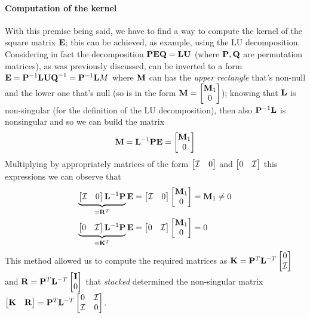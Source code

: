 	\paragraph{Computation of the kernel} With this premise being said, we have to find a way to compute the kernel of the square matrix $\mathbf{E}$; this can be achieved, as example, using the LU decomposition. Considering in fact the decomposition $\mathbf{PEQ} = \mathbf{LU}$ (where $\mathbf{P}, \mathbf{Q}$ are permutation matrices), as was previously discussed, can be inverted to a form $\mathbf{E} = \mathbf{P}^{-1} \mathbf{LUQ}^{-1} = \mathbf{P}^{-1} \mathbf{L} M$ where $\mathbf{M}$ can has the \textit{upper rectangle} that's non-null and the lower one that's null (so is in the form $\mathbf{M} = \begin{bmatrix} \mathbf{M}_1 \\ 0 \end{bmatrix}$); knowing that $\mathbf{L}$ is non-singular (for the definition of the LU decomposition), then also $\mathbf{P}^{-1} \mathbf{L}$ is nonsingular and so we can build the matrix
	\[ \mathbf{M} = \mathbf{L}^{-1} \mathbf{PE} = \begin{bmatrix} \mathbf{M}_1 \\ 0 \end{bmatrix} \]
	Multiplying by appropriately matrices of the form $\begin{bmatrix} \mathcal I & 0  \end{bmatrix}$ and $\begin{bmatrix} 0 & \mathcal I \end{bmatrix}$ this expressions we can observe that 
	\begin{align*}
		\underbrace{\begin{bmatrix} \mathcal I & 0  \end{bmatrix} \mathbf{L}^{-1} \mathbf{P}}_{=\mathbf{R}^T} \mathbf{E} = \begin{bmatrix} \mathcal I & 0 \end{bmatrix} \begin{bmatrix} \mathbf{M}_1 \\ 0 \end{bmatrix} & = \mathbf{M}_1 \neq 0 \\
		\underbrace{\begin{bmatrix} 0 & \mathcal I  \end{bmatrix} \mathbf{L}^{-1} \mathbf{P}}_{=\mathbf{K}^T}  \mathbf{E} = \begin{bmatrix} 0 & \mathcal I  \end{bmatrix} \begin{bmatrix} \mathbf{M}_1 \\ 0 \end{bmatrix} & = 0 
	\end{align*}
	This method allowed us to compute the required matrices as $\mathbf{K} = \mathbf{P}^T \mathbf{L}^{-T} \begin{bmatrix} 0 \\ \mathcal I \end{bmatrix}$ and $\mathbf{R} = \mathbf{P}^T \mathbf{L}^{-T} \begin{bmatrix} \mathbf{I} \\ 0 \end{bmatrix}$ that \textit{stacked} determined the non-singular matrix $\begin{bmatrix} \mathbf{K} & \mathbf{R} \end{bmatrix} = \mathbf{P}^T \mathbf{L}^{-T} \begin{bmatrix} 0 & \mathcal I \\ \mathcal I & 0 \end{bmatrix}$.
	
